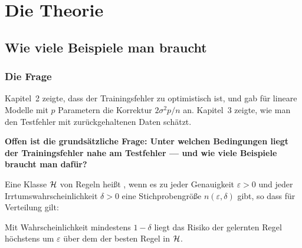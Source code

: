 \part{Die Theorie}

\chapter{Wie viele Beispiele man braucht}

\section{Die Frage}

\begin{merksatz}
Kapitel~2 zeigte, dass der Trainingsfehler zu optimistisch ist, und gab für lineare Modelle mit $p$ Parametern die Korrektur $2\sigma^{2}p/n$ an. Kapitel~3 zeigte, wie man den Testfehler mit zurückgehaltenen Daten schätzt.

\begin{center}
\begin{minipage}{0.9\textwidth}
\textbf{Offen ist die grundsätzliche Frage: Unter welchen Bedingungen liegt der Trainingsfehler  nahe am Testfehler --- und wie viele Beispiele braucht man dafür?}
\end{minipage}
\end{center}

\begin{center}
\begin{minipage}{0.88\textwidth}
\end{minipage}
\end{center}
\end{merksatz}

\begin{definition}
Eine Klasse $\mathcal{H}$ von Regeln heißt , wenn es zu jeder Genauigkeit $\varepsilon > 0$ und jeder Irrtumswahrscheinlichkeit $\delta > 0$ eine Stichprobengröße $n(\varepsilon,\delta)$ gibt, so dass für  Verteilung gilt:

\begin{center}
\begin{minipage}{0.88\textwidth}
Mit Wahrscheinlichkeit mindestens $1-\delta$ liegt das Risiko der gelernten Regel höchstens um $\varepsilon$ über dem der besten Regel in $\mathcal{H}$.
\end{minipage}
\end{center}
\end{definition}

